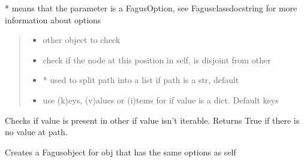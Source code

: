 \documentclass[a4paper,10pt,english]{sphinxmanual}
\begin{document}
\begin{fulllineitems}
\begin{fulllineitems}
\sphinxAtStartPar
* means that the parameter is a FagusOption, see Fagus\sphinxhyphen{}class\sphinxhyphen{}docstring for more information about options
\begin{quote}\begin{description}
\begin{itemize}
\item {}
\sphinxAtStartPar
{} \textendash{} other object to check

\item {}
\sphinxAtStartPar
{} \textendash{} check if the node at this position in self, is disjoint from other

\item {}
\sphinxAtStartPar
{} \textendash{} * used to split path into a list if path is a str, default 

\item {}
\sphinxAtStartPar
{} \textendash{} use (k)eys, (v)alues or (i)tems for if value is a dict. Default keys

\end{itemize}

\end{description}\end{quote}
\begin{description}
\sphinxAtStartPar
Checks if value is present in other if value isn’t iterable. Returns True if there is no value at path.

\end{description}

\end{fulllineitems}


\begin{fulllineitems}
\label{\detokenize{fagus:fagus.Fagus.child}}
\pysigstartsignatures
{}
\pysigstopsignatures
\sphinxAtStartPar
Creates a Fagus\sphinxhyphen{}object for obj that has the same options as self


\end{fulllineitems}
\end{fulllineitems}
\end{document}
